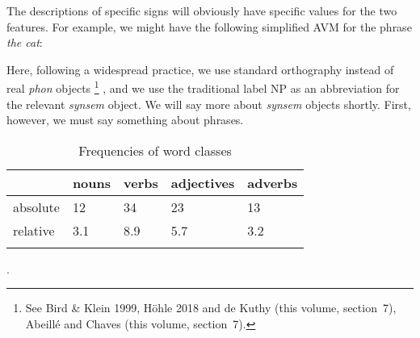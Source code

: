 \documentclass[output=paper
	        ,collection
	        ,collectionchapter
 	        ,biblatex
                ,babelshorthands
                ,newtxmath
                ,draftmode
                ,colorlinks, citecolor=brown
]{langscibook}
\begin{document}


The descriptions of specific signs will obviously have specific values for the two features. For example, we might have the following simplified AVM for the phrase \emph{the cat}:



Here, following a widespread practice, we use standard orthography instead of real \emph{phon} objects%
%
\footnote{See Bird \& Klein 1999, Höhle 2018%
	and de Kuthy (this volume, section~7), Abeillé and Chaves (this volume, section~7).}%
%
, and we use the traditional label NP as an abbreviation for the relevant \emph{synsem} object. We will say more about \emph{synsem} objects shortly. First, however, we must say something about phrases.




















\begin{table}
\caption{Frequencies of word classes}
\label{tab:1:frequencies}
 \begin{tabular}{lllll} %
  \lsptoprule
            & nouns & verbs & adjectives & adverbs\\ %
  \midrule
  absolute  &   12 &    34  &    23     & 13\\
  relative  &   3.1 &   8.9 &    5.7    & 3.2\\
  \lspbottomrule
 \end{tabular}
\end{table}

\citep{Chomsky57a}.
\end{document}
